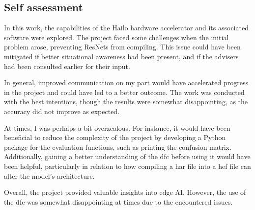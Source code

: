 \subsection*{Self assessment}
In this work, the capabilities of the Hailo hardware accelerator and its associated software were explored.
The project faced some challenges when the initial problem arose, preventing ResNets from compiling.
This issue could have been mitigated if better situational awareness had been present, and if the advisers had been consulted earlier for their input.

In general, improved communication on my part would have accelerated progress in the project and could have led to a better outcome.
The work was conducted with the best intentions, though the results were somewhat disappointing, as the accuracy did not improve as expected.

At times, I was perhaps a bit overzealous.
For instance, it would have been beneficial to reduce the complexity of the project by developing a Python package for the evaluation functions, such as printing the confusion matrix.
Additionally, gaining a better understanding of the \acrshort{dfc} before using it would have been helpful, particularly in relation to how compiling a \acrshort{har} file into a \acrshort{hef} file can alter the model's architecture.

Overall, the project provided valuable insights into edge AI.
However, the use of the \acrshort{dfc} was somewhat disappointing at times due to the encountered issues.


